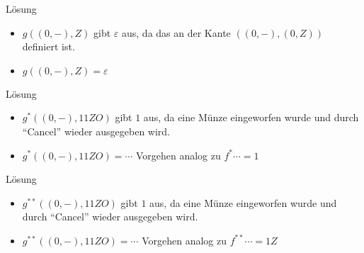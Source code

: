 \begin{frame}
	\begin{exampleblock}{Lösung}
		\begin{itemize}
			\item $g((0,-),Z)$ gibt $\varepsilon$ aus, da das an der Kante $((0,-),(0,Z))$ definiert ist.
			\item $g((0,-),Z)=\varepsilon$
		\end{itemize}
	\end{exampleblock}
\end{frame}
\begin{frame}
	\begin{exampleblock}{Lösung}
		\begin{itemize}
			\item $g^*((0,-),11ZO)$ gibt $1$ aus, da eine Münze eingeworfen wurde und durch "`Cancel"' wieder ausgegeben wird.
			\item $g^*((0,-),11ZO)=\cdots$ Vorgehen analog zu $f^*\cdots = 1$
		\end{itemize}
	\end{exampleblock}
	\pause
	\begin{exampleblock}{Lösung}
		\begin{itemize}
			\item $g^{**}((0,-),11ZO)$ gibt $1$ aus, da eine Münze eingeworfen wurde und durch "`Cancel"' wieder ausgegeben wird.
			\item $g^{**}((0,-),11ZO)=\cdots$ Vorgehen analog zu $f^{**}\cdots = 1Z$
		\end{itemize}
	\end{exampleblock}
\end{frame}

